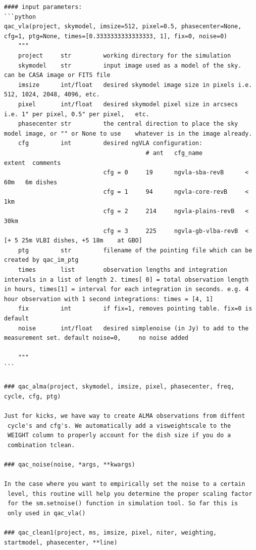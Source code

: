 \documentclass[11pt,twoside]{article}
\begin{document}
\begin{verbatim}
#### input parameters:
```python
qac_vla(project, skymodel, imsize=512, pixel=0.5, phasecenter=None, cfg=1, ptg=None, times=[0.3333333333333333, 1], fix=0, noise=0)
    """
    project     str         working directory for the simulation
    skymodel    str         input image used as a model of the sky. can be CASA image or FITS file
    imsize      int/float   desired skymodel image size in pixels i.e. 512, 1024, 2048, 4096, etc.
    pixel       int/float   desired skymodel pixel size in arcsecs i.e. 1" per pixel, 0.5" per pixel,   etc.
    phasecenter str         the central direction to place the sky model image, or "" or None to use    whatever is in the image already.
    cfg         int         desired ngVLA configuration:
                                        # ant   cfg_name            extent  comments
                            cfg = 0     19      ngvla-sba-revB      < 60m   6m dishes
                            cfg = 1     94      ngvla-core-revB     < 1km
                            cfg = 2     214     ngvla-plains-revB   < 30km 
                            cfg = 3     225     ngvla-gb-vlba-revB  <       [+ 5 25m VLBI dishes, +5 18m    at GBO]
    ptg         str         filename of the pointing file which can be created by qac_im_ptg
    times       list        observation lengths and integration intervals in a list of length 2. times[ 0] = total observation length in hours, times[1] = interval for each integration in seconds. e.g. 4  hour observation with 1 second integrations: times = [4, 1]
    fix         int         if fix=1, removes pointing table. fix=0 is default
    noise       int/float   desired simplenoise (in Jy) to add to the measurement set. default noise=0,     no noise added
    
    """
```

### qac_alma(project, skymodel, imsize, pixel, phasecenter, freq, cycle, cfg, ptg)

Just for kicks, we have way to create ALMA observations from diffent
 cycle's and cfg's. We automatically add a visweightscale to the
 WEIGHT column to properly account for the dish size if you do a
 combination tclean.

### qac_noise(noise, *args, **kwargs)

In the case where you want to empirically set the noise to a certain
 level, this routine will help you determine the proper scaling factor
 for the sm.setnoise() function in simulation tool. So far this is
 only used in qac_vla()

### qac_clean1(project, ms, imsize, pixel, niter, weighting, startmodel, phasecenter, **line)


\end{verbatim}
\end{document}
